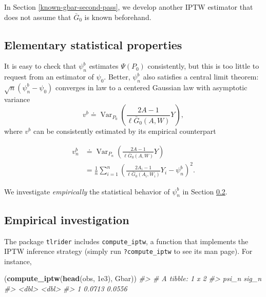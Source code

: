 \documentclass[11pt,openright,twoside]{book}
\newenvironment{Shaded}{\begin{snugshade}}{\end{snugshade}}
\newcommand{\CommentTok}[1]{\textcolor[rgb]{0.56,0.35,0.01}{\textit{#1}}}
\newcommand{\FloatTok}[1]{\textcolor[rgb]{0.00,0.00,0.81}{#1}}
\newcommand{\KeywordTok}[1]{\textcolor[rgb]{0.13,0.29,0.53}{\textbf{#1}}}
\newcommand{\NormalTok}[1]{#1}
\DeclareMathOperator{\Var}{Var}
\newcommand{\defq}{\doteq}
\newcommand{\Gbar}{\bar{G}}
\theoremstyle{definition}
\theoremstyle{definition}
\theoremstyle{definition}
\theoremstyle{remark}
\begin{document}
In Section \ref{known-gbar-second-pass}, we develop another IPTW estimator
that does not assume that \(\Gbar_{0}\) is known beforehand.

\hypertarget{elementary-statistical-properties}{%
\subsection{Elementary statistical properties}\label{elementary-statistical-properties}}

It is easy to check that \(\psi_{n}^{b}\) estimates \(\Psi(P_{0})\) consistently,
but this is too little to request from an estimator of \(\psi_{0}\). Better,
\(\psi_{n}^{b}\) also satisfies a central limit theorem: \(\sqrt{n} (\psi_{n}^{b} - \psi_{0})\) converges in law to a centered Gaussian law with
asymptotic variance \begin{equation*}v^{b}     \defq     \Var_{P_{0}}
\left(\frac{2A-1}{\ell\Gbar_{0}(A,W)}Y\right),\end{equation*} where \(v^{b}\)
can be consistently estimated by its empirical counterpart

\begin{align}
\label{eq:v-n-b}      v_{n}^{b}       &\defq      \Var_{P_{n}}
\left(\frac{2A-1}{\ell\Gbar_{0}(A,W)}Y\right) \\ 
&=        \frac{1}{n}        \sum_{i=1}^{n}\left(\frac{2A_{i}-1}{\ell\Gbar_{0}
(A_{i},W_{i})} Y_{i} - \psi_{n}^{b}\right)^{2}.
\end{align}

We investigate \emph{empirically} the statistical behavior of \(\psi_{n}^{b}\) in
Section \ref{empirical-inves-IPTW}.

\hypertarget{empirical-inves-IPTW}{%
\subsection{Empirical investigation}\label{empirical-inves-IPTW}}

The package \texttt{tlrider} includes \texttt{compute\_iptw}, a function that implements the
IPTW inference strategy (simply run \texttt{?compute\_iptw} to see its man page). For
instance,

\begin{Shaded}
\begin{Highlighting}[]
\NormalTok{(}\KeywordTok{compute_iptw}\NormalTok{(}\KeywordTok{head}\NormalTok{(obs, }\FloatTok{1e3}\NormalTok{), Gbar))}
\CommentTok{#> # A tibble: 1 x 2}
\CommentTok{#>    psi_n  sig_n}
\CommentTok{#>    <dbl>  <dbl>}
\CommentTok{#> 1 0.0713 0.0556}
\end{Highlighting}
\end{Shaded}
\end{document}
